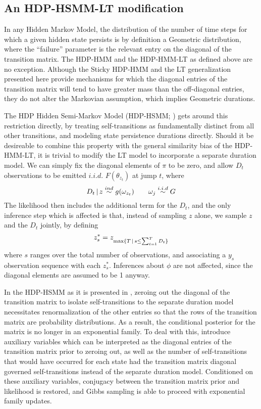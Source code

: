 \subsection{An HDP-HSMM-LT modification}
\label{sec:an-hsmm-modification}

In any Hidden Markov Model, the distribution of the number of time
steps for which a given hidden state persists is by definition a
Geometric distribution, where the ``failure'' parameter is the
relevant entry on the diagonal of the transition matrix.  The HDP-HMM
and the HDP-HMM-LT as defined above are no exception.  Although the
Sticky HDP-HMM \cite{fox2008hdp} and the LT generalization presented
here provide mechanisms for which the diagonal entries of the
transition matrix will tend to have greater mass than the off-diagonal
entries, they do not alter the Markovian assumption, which implies
Geometric durations.

The HDP Hidden Semi-Markov Model (HDP-HSMM;
\citet{johnson2013bayesian}) gets around this restriction directly, by
treating self-transitions as fundamentally distinct from all other
transitions, and modeling state persistence durations directly.
Should it be desireable to combine this property with the general
similarity bias of the HDP-HMM-LT, it is trivial to modify the LT
model to incorporate a separate duration model.  We can simply fix the
diagonal elements of $\pi$ to be zero, and allow $D_t$ observations to
be emitted $i.i.d.$ $F(\theta_{z_t})$ at jump $t$, where
\begin{equation}
  \label{eq:95} D_t \, \vert \, z \stackrel{ind}{\sim} g(\omega_{z_t})
\qquad \omega_j \stackrel{i.i.d}{\sim} G
\end{equation} The likelihood then includes the additional term for
the $D_t$, and the only inference step which is affected is that,
instead of sampling $z$ alone, we sample $z$ and the $D_t$ jointly, by
defining
\begin{equation} z^*_s = z_{\max\{T \, \vert \, s \leq \sum_{t=1}^T D_t\}}
\end{equation} where $s$ ranges over the total number of observations,
and associating a $y_s$ observation sequence with each $z^*_s$.
Inferences about $\phi$ are not affected, since the diagonal elements
are assumed to be 1 anyway.

In the HDP-HSMM as it is presented in \cite{johnson2013bayesian},
zeroing out the diagonal of the transition matrix to isolate
self-transitions to the separate duration model necessitates
renormalization of the other entries so that the rows of the
transition matrix are probability distributions.  As a result, the
conditional posterior for the matrix is no longer in an exponential
family.  To deal with this, \citeauthor{johnson2013bayesian} introduce
auxiliary variables which can be interpreted as the diagonal entries
of the transition matrix prior to zeroing out, as well as the number
of self-transitions that would have occurred for each state had the
transition matrix diagonal governed self-transitions instead of the
separate duration model.  Conditioned on these auxiliary variables,
conjugacy between the transition matrix prior and likelihood is
restored, and Gibbs sampling is able to proceed with exponential
family updates.

